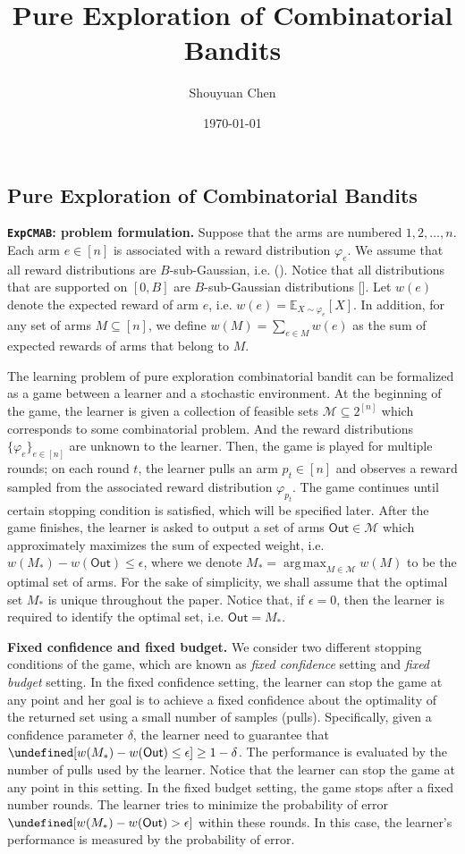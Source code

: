 \documentclass{article}
\title{Pure Exploration of Combinatorial Bandits}
\author{Shouyuan Chen}
\date{\today}
\newcommand{\Problem}{\texttt{ExpCMAB}\xspace}
\newcommand{\Rew}{\varphi}
\newcommand{\E}{\mathbb E}
\newcommand{\M}{\mathcal M}
\DeclareMathOperator*{\argmax}{arg\,max}
\newcommand{\out}{\mathsf{Out}}
\let\Pr\undefined
\DeclareMathOperator{\Pr}{Pr}
\begin{document}
\begin{spacing}{1.1}
\newpage

\maketitle


\section{Pure Exploration of Combinatorial Bandits}


\textbf{\Problem: problem formulation.}
Suppose that the arms are numbered $1,2,\ldots,n$.
Each arm $e\in[n]$ is associated with a reward distribution $\Rew_e$. 
We assume that all reward distributions are $B$-sub-Gaussian, i.e. ().
Notice that all distributions that are supported on $[0,B]$ are $B$-sub-Gaussian distributions [].
Let $w(e)$ denote the expected reward of arm $e$, i.e. $w(e)=\E_{X\sim \Rew_e}[X]$.
In addition, for any set of arms $M\subseteq [n]$, we define $w(M) = \sum_{e\in M} w(e)$ as the sum of expected rewards of arms that belong to $M$.

The learning problem of pure exploration combinatorial bandit can be formalized as a game between a learner and a stochastic environment.
At the beginning of the game, the learner is given a collection of feasible sets $\M\subseteq 2^{[n]}$ which corresponds to some combinatorial problem. 
And the reward distributions $\{\Rew_e\}_{e\in[n]}$ are unknown to the learner.
Then, the game is played for multiple rounds;
on each round $t$, the learner pulls an arm $p_t\in [n]$ and observes a reward sampled from the associated reward distribution $\Rew_{p_t}$.
The game continues until certain stopping condition is satisfied, which will be specified later.
After the game finishes, the learner is asked to output a set of arms $\out \in \M$ which approximately maximizes the sum of expected weight, i.e. $w(M_*) - w(\out) \le \epsilon$, where we denote $M_*=\argmax_{M\in \M} w(M)$ to be the optimal set of arms.
For the sake of simplicity, we shall assume that the optimal set $M_*$ is unique throughout the paper.
Notice that, if $\epsilon = 0$, then the learner is required to identify the optimal set, i.e. $\out = M_*$.



\textbf{Fixed confidence and fixed budget.} We consider two different stopping conditions of the game, which are known as \emph{fixed confidence} setting and \emph{fixed budget} setting. 
In the fixed confidence setting, the learner can stop the game at any point and her goal is to achieve a fixed confidence about the optimality of the returned set using a small number of samples (pulls).
Specifically, given a confidence parameter $\delta$, the learner need to guarantee that $\Pr[w(M_*)-w(\out) \le \epsilon] \ge 1-\delta$.
The performance is evaluated by the number of pulls used by the learner.
Notice that the learner can stop the game at any point in this setting.
In the fixed budget setting, the game stops after a fixed number rounds.
The learner tries to minimize the probability of error $\Pr[w(M_*)-w(\out) > \epsilon]$ within these rounds.
In this case, the learner's performance is measured by the probability of error.



\end{spacing}
\end{document}
